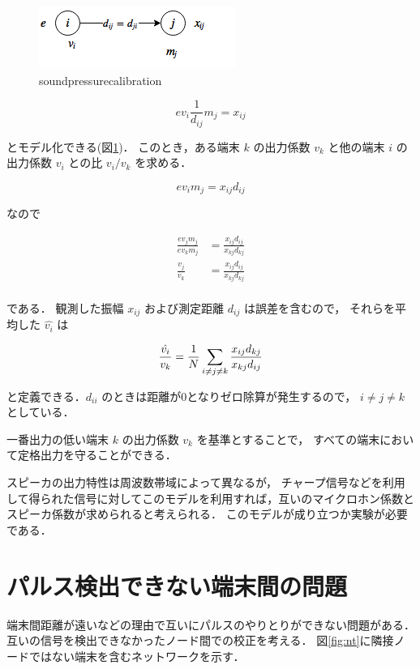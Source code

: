 \begin{figure}[p]\centering
  \hspace{-2mm}\includegraphics[clip,width=1.1\hsize]{img/sound_pressure_calibration.png}
  \caption{soundpressurecalibration}\label{fig:soundpressurecalibration}
\end{figure}

$$
e v_i \frac{1}{d_{ij}} m_j = x_{ij}
$$

とモデル化できる(図\ref{fig:soundpressurecalibration})．
このとき，ある端末 $k$ の出力係数 $v_k$ と他の端末 $i$ の出力係数 $v_i$ との比 $v_i/v_k$ を求める．

$$
e v_i m_j = x_{ij}d_{ij}
$$

なので

$$\begin{aligned}
\frac{e v_j m_j}{e v_k m_j} &= \frac{x_{ij} d_{ij}}{x_{kj} d_{kj}} \\
\frac{v_j}{v_k} &= \frac{x_{ij} d_{ij}}{x_{kj}d_{kj}} \\
\end{aligned}$$

である．
観測した振幅 $x_{ij}$ および測定距離 $d_{ij}$ は誤差を含むので，
それらを平均した $\hat{v_i}$ は

$$
\frac{\hat{v_i}}{v_k} = \frac{1}{N} \sum_{i\neq j \neq k} \frac{x_{ij} d_{kj}}{x_{kj}d_{ij}} \\
$$

と定義できる．$d_{ii}$ のときは距離が0となりゼロ除算が発生するので，
$i\neq j \neq k$ としている．

一番出力の低い端末 $k$ の出力係数 $v_k$ を基準とすることで，
すべての端末において定格出力を守ることができる．

スピーカの出力特性は周波数帯域によって異なるが，
チャープ信号などを利用して得られた信号に対してこのモデルを利用すれば，互いのマイクロホン係数とスピーカ係数が求められると考えられる．
このモデルが成り立つか実験が必要である．





\section{パルス検出できない端末間の問題}
端末間距離が遠いなどの理由で互いにパルスのやりとりができない問題がある．
互いの信号を検出できなかったノード間での校正を考える．
図\ref{fig:nt}に隣接ノードではない端末を含むネットワークを示す．


